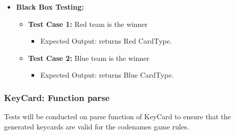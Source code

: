 \documentclass[12pt]{article}
\begin{document}
\begin{itemize}
    \item \textbf{Black Box Testing:}
    \begin{itemize}
       \item \textbf{Test Case 1:} Red team is the winner
            \begin{itemize}
            
            \item Expected Output: returns Red CardType.
            \end{itemize}
        \item \textbf{Test Case 2:} Blue team is the winner
            \begin{itemize}
            
            \item Expected Output: returns Blue CardType.
            \end{itemize}
    \end{itemize}
\end{itemize}


\subsubsection{KeyCard: Function parse}
Tests will be conducted on parse function of KeyCard to ensure that the generated keycards are valid for the codenames game rules.
\end{document}
